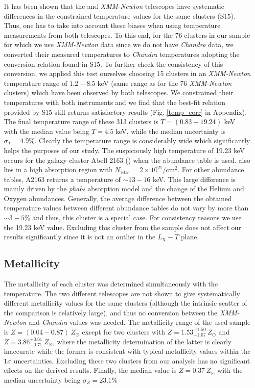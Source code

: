 \documentclass{aa}   %
\begin{document}
It has been shown that the  and \textit{XMM-Newton} telescopes have systematic differences in the constrained temperature values for the same clusters (S15). Thus, one has to take into account these biases when using temperature measurements from both telescopes. To this end, for the 76 clusters in our sample for which we use \textit{XMM-Newton} data since we do not have \textit{Chandra} data, we converted their measured temperatures to \textit{Chandra} temperatures adopting the conversion relation found in S15. To further check the consistency of this conversion, we applied this test ourselves choosing 15 clusters in an \textit{XMM-Newton} temperature range of $1.2-8.5$ keV (same range as for the 76 \textit{XMM-Newton} clusters) which have been observed by both telescopes. We constrained their temperatures with both instruments and we find that the best-fit relation provided by S15 still returns satisfactory results (Fig. \ref{temp_corr} in Appendix).
The final temperature range of these 313 clusters is $T=(0.83-19.24)$ keV with the median value being $T=4.5$ keV, while the median uncertainty is $\sigma _T=4.9$\%. Clearly the temperature range is considerably wide which significantly helps the purposes of our study. The suspiciously high temperature of 19.23 keV occurs for the galaxy cluster Abell 2163 () when the \citet{aspl} abundance table is used.  also lies in a high absorption region with $N_{\text{Htot}}=2\times 10^{21}$/cm$^2$. For other abundance tables, A2163 returns a temperature of $\sim 13-16$ keV. This large difference is mainly driven by the \textit{phabs} absorption model and the change of the Helium and Oxygen abundances. Generally, the average difference between the obtained temperature values between different abundance tables do not vary by more than $\sim 3-5$\% and thus, this cluster is a special case. For consistency reasons we use the 19.23 keV value. Excluding this cluster from the sample does not affect our results significantly since it is not an outlier in the $L_{\text{X}}-T$ plane.

\subsection{Metallicity}

The metallicity of each cluster was determined simultaneously with the temperature. The two different telescopes are not shown to give systematically different metallicity values for the same clusters (although the intrinsic scatter of the comparison is relatively large), and thus no conversion between the \textit{XMM-Newton} and \textit{Chandra} values was needed. The metallicity range of the used sample is $Z=(0.04-0.87)\ Z_{\odot}$ except for two clusters with  $Z=1.53^{+1.50}_{-1.07}\ Z_{\odot}$ and  $Z=3.86^{+0.61}_{-0.71}\ Z_{\odot}$, where the metallicity determination of the latter is clearly inaccurate while the former is consistent with typical metallicity values within the $1\sigma$ uncertainties. Excluding these two clusters from our analysis has no significant effects on the derived results. Finally, the median value is $Z=0.37\ Z_{\odot}$ with the median uncertainty being $\sigma _Z=23.1$\%
\end{document}
